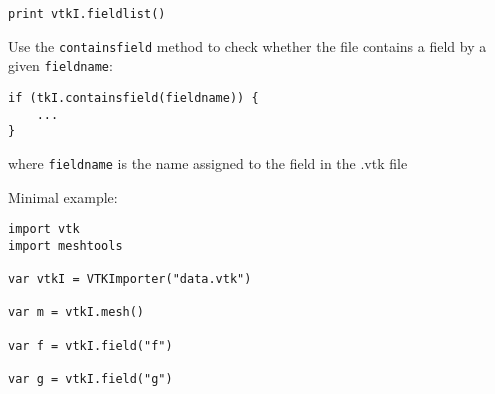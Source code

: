 \begin{lstlisting}
print vtkI.fieldlist()
\end{lstlisting}

Use the \texttt{containsfield} method to check whether the file contains
a field by a given \texttt{fieldname}:

\begin{lstlisting}
if (tkI.containsfield(fieldname)) {
    ... 
}
\end{lstlisting}

where \texttt{fieldname} is the name assigned to the field in the .vtk
file

Minimal example:

\begin{lstlisting}
import vtk
import meshtools 

var vtkI = VTKImporter("data.vtk")

var m = vtkI.mesh()

var f = vtkI.field("f")

var g = vtkI.field("g")
\end{lstlisting}
